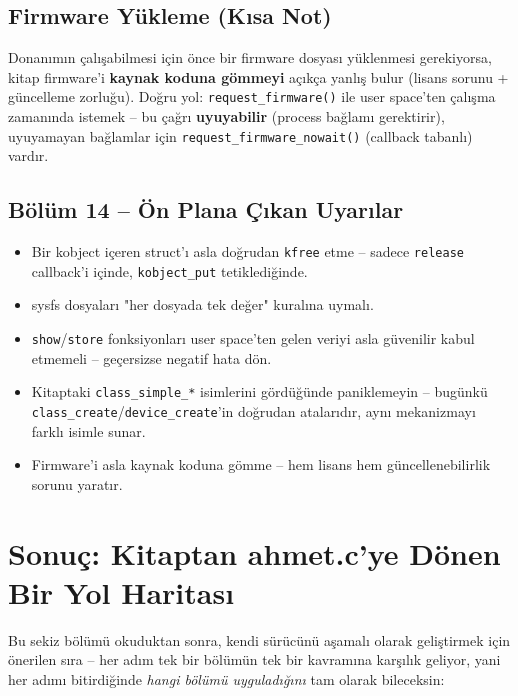 \documentclass[11pt,a4paper]{article}
\begin{document}
\subsection{Firmware Y\"ukleme (K\i sa Not)}

Donanımın çalışabilmesi için önce bir firmware dosyası yüklenmesi
gerekiyorsa, kitap firmware'i \textbf{kaynak koduna gömmeyi} açıkça
yanlış bulur (lisans sorunu + güncelleme zorluğu). Doğru yol:
\texttt{request\_firmware()} ile user space'ten çalışma zamanında
istemek -- bu çağrı \textbf{uyuyabilir} (process bağlamı gerektirir),
uyuyamayan bağlamlar için \texttt{request\_firmware\_nowait()}
(callback tabanlı) vardır.

\subsection*{B\"ol\"um 14 -- \"On Plana \c{C}\i kan Uyar\i lar}
\begin{itemize}[leftmargin=1.2cm]
  \item Bir kobject içeren struct'ı asla doğrudan \texttt{kfree} etme
  -- sadece \texttt{release} callback'i içinde, \texttt{kobject\_put}
  tetiklediğinde.
  \item sysfs dosyaları "her dosyada tek değer" kuralına uymalı.
  \item \texttt{show}/\texttt{store} fonksiyonları user space'ten gelen
  veriyi asla güvenilir kabul etmemeli -- geçersizse negatif hata dön.
  \item Kitaptaki \texttt{class\_simple\_*} isimlerini gördüğünde
  paniklemeyin -- bugünkü \texttt{class\_create}/\texttt{device\_create}'in
  doğrudan atalarıdır, aynı mekanizmayı farklı isimle sunar.
  \item Firmware'i asla kaynak koduna gömme -- hem lisans hem
  güncellenebilirlik sorunu yaratır.
\end{itemize}

\newpage

\section*{Sonu\c{c}: Kitaptan ahmet.c'ye D\"onen Bir Yol Haritas\i}

Bu sekiz bölümü okuduktan sonra, kendi sürücünü aşamalı olarak
geliştirmek için önerilen sıra -- her adım tek bir bölümün tek bir
kavramına karşılık geliyor, yani her adımı bitirdiğinde \emph{hangi
bölümü uyguladığını} tam olarak bileceksin:
\end{document}
